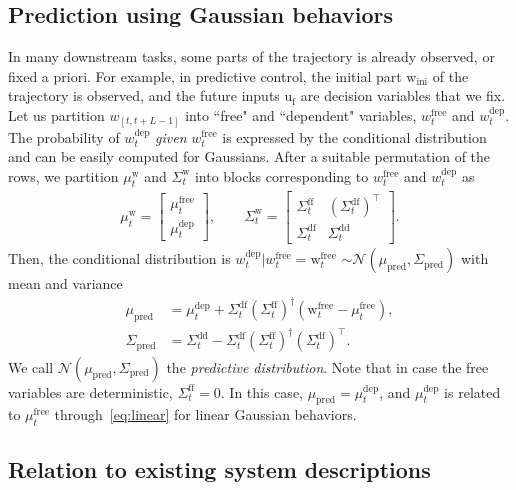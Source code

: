 \documentclass[letterpaper, 10 pt, conference]{ieeeconf}
\def\wir{\mathrm{w}_\mathrm{ini}}
\def\ufr{\mathrm{u}_\mathrm{f}}
\def\mp{\mu_\mathrm{pred}}
\def\mw{\mu^\mathrm{w}_t}
\def\mdep{\mu^\mathrm{dep}_t}
\def\mfree{\mu^\mathrm{free}_t}
\def\wfree{w^\mathrm{free}_t}
\def\wdep{w^\mathrm{dep}_t}
\def\Sw{\Sigma^\mathrm{w}}
\def\Sp{\Sigma_\mathrm{pred}}
\begin{document}
\subsection{Prediction using Gaussian behaviors} \label{sec:pred}
In many downstream tasks, some parts of the trajectory is already observed, or fixed a priori.
For example, in predictive control, the initial part $\wir$ of the trajectory is observed, and the future inputs $\ufr$ are decision variables that we fix.
Let us partition $w_{[t,t+L-1]}$ into ``free" and ``dependent" variables, $\wfree$ and $\wdep$.
The probability of $\wdep$ \textit{given} $\wfree$ is expressed by the conditional distribution and can be easily computed for Gaussians.
After a suitable permutation of the rows, we partition $\mw$ and $\Sw_t$ into blocks corresponding to $\wfree$ and $\wdep$ as
\begin{align*}
    \mw = \begin{bmatrix}
    \mfree \\ \mdep
    \end{bmatrix}, \qquad 
    \Sw_t = \begin{bmatrix}
        \Sigma^\mathrm{ff}_t & (\Sigma^\mathrm{df}_t)^\top \\
        \Sigma^\mathrm{df}_t & \Sigma^\mathrm{dd}_t
    \end{bmatrix}.
\end{align*}
Then, the conditional distribution is  $\wdep|\wfree=\mathrm{w}^\mathrm{free}_t$ $\sim \mathcal{N}(\mp,\Sp)$ with mean and variance
\begin{align}
\mp & = \mdep + \Sigma^\mathrm{df}_t(\Sigma^\mathrm{ff}_t)^{\dagger} \left(\mathrm{w}^\mathrm{free}_t - \mfree\right), \label{eq:pred_mean_theory} \\
\Sp & = \Sigma^\mathrm{dd}_t - \Sigma^\mathrm{df}_t(\Sigma^\mathrm{ff}_t)^{\dagger}(\Sigma^\mathrm{df}_t)^\top.
\label{eq:pred_var_theory}
\end{align}
We call $\mathcal{N}(\mp,\Sp)$ the \textit{predictive distribution}.
Note that in case the free variables are deterministic, $\Sigma^\mathrm{ff}_t=0$. In this case, $\mp = \mdep$, and  $\mdep$ is related to $ \mfree$ through~\eqref{eq:linear} for linear Gaussian behaviors.


\subsection{Relation to existing system descriptions}
\end{document}
